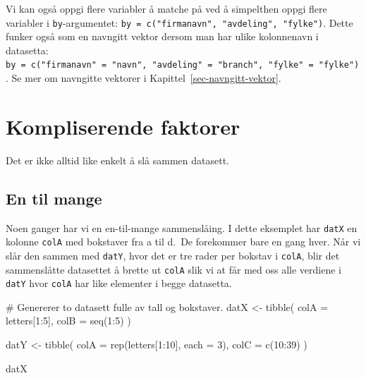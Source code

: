 \documentclass[
  letterpaper,
  DIV=11,
  numbers=noendperiod]{scrreprt}
\newenvironment{Shaded}{\begin{snugshade}}{\end{snugshade}}
\newcommand{\AttributeTok}[1]{\textcolor[rgb]{0.40,0.45,0.13}{#1}}
\newcommand{\CommentTok}[1]{\textcolor[rgb]{0.37,0.37,0.37}{#1}}
\newcommand{\DecValTok}[1]{\textcolor[rgb]{0.68,0.00,0.00}{#1}}
\newcommand{\FunctionTok}[1]{\textcolor[rgb]{0.28,0.35,0.67}{#1}}
\newcommand{\NormalTok}[1]{\textcolor[rgb]{0.00,0.23,0.31}{#1}}
\newcommand{\OtherTok}[1]{\textcolor[rgb]{0.00,0.23,0.31}{#1}}
\newcommand{\SpecialCharTok}[1]{\textcolor[rgb]{0.37,0.37,0.37}{#1}}
\begin{document}
Vi kan også oppgi flere variabler å matche på ved å simpelthen oppgi
flere variabler i \texttt{by}-argumentet:
\texttt{by\ =\ c("firmanavn",\ "avdeling",\ "fylke")}. Dette funker også
som en navngitt vektor dersom man har ulike kolonnenavn i datasetta:
\texttt{by\ =\ c("firmanavn"\ =\ "navn",\ "avdeling"\ =\ "branch",\ "fylke"\ =\ "fylke")}.
Se mer om navngitte vektorer i Kapittel~\ref{sec-navngitt-vektor}.

\hypertarget{kompliserende-faktorer}{%
\section{Kompliserende faktorer}\label{kompliserende-faktorer}}

Det er ikke alltid like enkelt å slå sammen datasett.

\hypertarget{en-til-mange}{%
\subsection{En til mange}\label{en-til-mange}}

Noen ganger har vi en en-til-mange sammenslåing. I dette eksemplet har
\texttt{datX} en kolonne \texttt{colA} med bokstaver fra a til d.~De
forekommer bare en gang hver. Når vi slår den sammen med \texttt{datY},
hvor det er tre rader per bokstav i \texttt{colA}, blir det sammenslåtte
datasettet å brette ut \texttt{colA} slik vi at får med oss alle
verdiene i \texttt{datY} hvor \texttt{colA} har like elementer i begge
datasetta.

\begin{Shaded}
\begin{Highlighting}[]
\CommentTok{\# Genererer to datasett fulle av tall og bokstaver.}
\NormalTok{datX }\OtherTok{\textless{}{-}} \FunctionTok{tibble}\NormalTok{(}
  \AttributeTok{colA =}\NormalTok{ letters[}\DecValTok{1}\SpecialCharTok{:}\DecValTok{5}\NormalTok{],}
  \AttributeTok{colB =} \FunctionTok{seq}\NormalTok{(}\DecValTok{1}\SpecialCharTok{:}\DecValTok{5}\NormalTok{)}
\NormalTok{)}

\NormalTok{datY }\OtherTok{\textless{}{-}} \FunctionTok{tibble}\NormalTok{(}
  \AttributeTok{colA =} \FunctionTok{rep}\NormalTok{(letters[}\DecValTok{1}\SpecialCharTok{:}\DecValTok{10}\NormalTok{], }\AttributeTok{each =} \DecValTok{3}\NormalTok{), }
  \AttributeTok{colC =} \FunctionTok{c}\NormalTok{(}\DecValTok{10}\SpecialCharTok{:}\DecValTok{39}\NormalTok{)}
\NormalTok{)}

\NormalTok{datX }
\end{Highlighting}
\end{Shaded}
\end{document}
